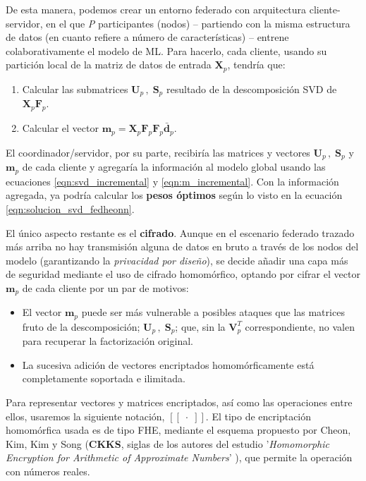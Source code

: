 \documentclass[00-Trabajo_Final.tex]{subfiles}
\begin{document}
De esta manera, podemos crear un entorno federado con arquitectura cliente-servidor, en el que \textit{P} participantes (nodos){ }--{ }partiendo con la misma estructura de datos (en cuanto refiere a número de características){ }--{ }entrene colaborativamente el modelo de ML. Para hacerlo, cada cliente, usando su partición local de la matriz de datos de entrada $\boldsymbol{X}_p$, tendría que:

\begin{enumerate}[noitemsep]
    \item Calcular las submatrices $\boldsymbol{U}_p\,,\;\boldsymbol{S}_p$ resultado de la descomposición SVD de $\boldsymbol{X}_p\boldsymbol{F}_p$.
    \item Calcular el vector $\boldsymbol{m}_p = \boldsymbol{X}_p\boldsymbol{F}_p\boldsymbol{F}_p \boldsymbol{\bar{d}}_p$.
\end{enumerate}

El coordinador/servidor, por su parte, recibiría las matrices y vectores $\boldsymbol{U}_p\,,\;\boldsymbol{S}_p$ y $\boldsymbol{m}_p$ de cada cliente y agregaría la información al modelo global usando las ecuaciones \eqref{eqn:svd_incremental} y \eqref{eqn:m_incremental}. Con la información agregada, ya podría calcular los \textbf{pesos óptimos} según lo visto en la ecuación \eqref{eqn:solucion_svd_fedheonn}.

\vspace{0.5em}

El único aspecto restante es el \textbf{cifrado}. Aunque en el escenario federado trazado más arriba no hay transmisión alguna de datos en bruto a través de los nodos del modelo (garantizando la \textit{privacidad por diseño}), se decide añadir una capa más de seguridad mediante el uso de cifrado homomórfico, optando por cifrar el vector $\boldsymbol{m}_p$ de cada cliente por un par de motivos:

\begin{itemize}[noitemsep]
    \item El vector $\boldsymbol{m}_p$ puede ser más vulnerable a posibles ataques que las matrices fruto de la descomposición; $\boldsymbol{U}_p\,,\;\boldsymbol{S}_p$; que, sin la $\boldsymbol{V}^T_p$ correspondiente, no valen para recuperar la factorización original.
    \item La sucesiva adición de vectores encriptados homomórficamente está completamente soportada e ilimitada.
\end{itemize}

Para representar vectores y matrices encriptados, así como las operaciones entre ellos, usaremos la siguiente notación, $[[\;\cdot\;]]$. El tipo de encriptación homomórfica usada es de tipo FHE, mediante el esquema propuesto por Cheon, Kim, Kim y Song (\textbf{CKKS}, siglas de los autores del estudio '\textit{Homomorphic Encryption for Arithmetic of Approximate Numbers}' \cite{paper_CKKS}), que permite la operación con números reales.
\end{document}
